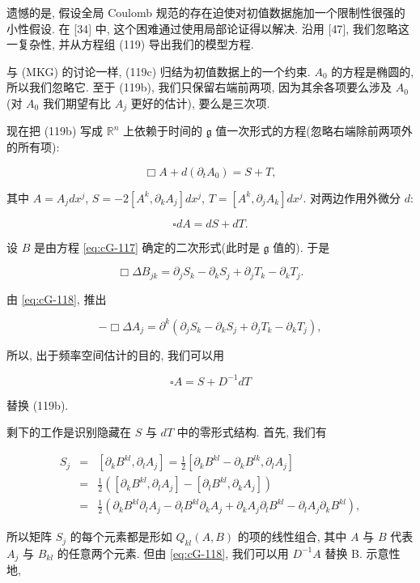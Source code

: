 遗憾的是, 假设全局 Coulomb 规范的存在迫使对初值数据施加一个限制性很强的小性假设. 在 {[}34{]} 中, 这个困难通过使用局部论证得以解决. 沿用 {[}47{]}, 我们忽略这一复杂性, 并从方程组 (119) 导出我们的模型方程. 

与 (MKG) 的讨论一样, (119c) 归结为初值数据上的一个约束. $A_{0}$ 的方程是椭圆的, 所以我们忽略它. 至于 (119b), 我们只保留右端前两项, 因为其余各项要么涉及 $A_{0}$(对 $A_0$ 我们期望有比 $A_j$ 更好的估计), 要么是三次项. 

现在把 (119b) 写成 $\mathbb{R}^n$ 上依赖于时间的 $\mathfrak{g}$ 值一次形式的方程(忽略右端除前两项外的所有项):

\[
\Box A + d(\partial_{t}A_{0}) = S + T, 
\]

其中 $A = A_{j}dx^{j}$, $S = -2[A^{k}, \partial_{k}A_{j}]dx^{j}$, $T = [A^k, \partial_jA_k]dx^j$. 对两边作用外微分 $d$:

\[
\square dA = dS + dT.
\]

设 $B$ 是由方程 \eqref{eq:cG-117} 确定的二次形式(此时是 $\mathfrak{g}$ 值的). 于是

\[
\Box\Delta B_{jk} = \partial_{j}S_{k} - \partial_{k}S_{j} + \partial_{j}T_{k} - \partial_{k}T_{j}.
\]

由 \eqref{eq:cG-118}, 推出

\[
-\Box\Delta A_{j} = \partial^{k}\left(\partial_{j}S_{k} - \partial_{k}S_{j} + \partial_{j}T_{k} - \partial_{k}T_{j}\right), 
\]

所以, 出于频率空间估计的目的, 我们可以用

\begin{equation}
\square A = S + D^{-1}dT\label{eq:cG-120}
\end{equation}

替换 (119b). 

剩下的工作是识别隐藏在 $S$ 与 $dT$ 中的零形式结构. 首先, 我们有

\[
\begin{array}{rcl}
S_{j} &=& [\partial_{k}B^{kl},  \partial_{l}A_{j}] = \frac{1}{2}[\partial_{k}B^{kl} - \partial_{k}B^{lk},  \partial_{l}A_{j}] \\
&=& \frac{1}{2}\left([\partial_{k}B^{kl},  \partial_{l}A_{j}] - [\partial_{l}B^{kl},  \partial_{k}A_{j}]\right) \\
&=& \frac{1}{2}\left(\partial_{k}B^{kl}\partial_{l}A_{j} - \partial_{l}B^{kl}\partial_{k}A_{j} + \partial_{k}A_{j}\partial_{l}B^{kl} - \partial_{l}A_{j}\partial_{k}B^{kl}\right), 
\end{array}
\]

所以矩阵 $S_{j}$ 的每个元素都是形如 $Q_{kl}(A,  B)$ 的项的线性组合, 其中 $A$ 与 $B$ 代表 $A_{j}$ 与 $B_{kl}$ 的任意两个元素. 但由 \eqref{eq:cG-118}, 我们可以用 $D^{-1}A$ 替换 B. 示意性地, 

